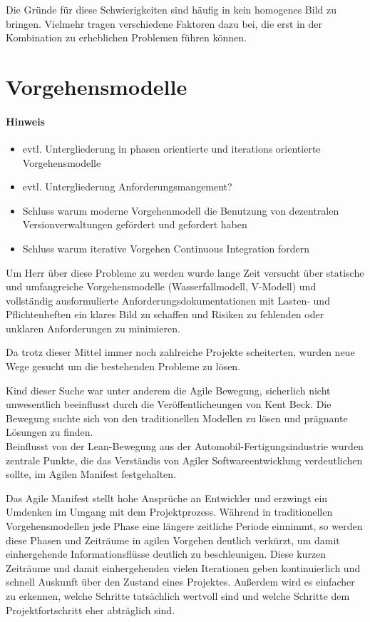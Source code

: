 \documentclass[10pt,a4paper]{book}
\begin{document}
Die Gründe für diese Schwierigkeiten sind häufig in kein homogenes Bild zu bringen. Vielmehr tragen verschiedene Faktoren dazu bei, die erst in der Kombination zu erheblichen Problemen führen können.

\section{Vorgehensmodelle}
\paragraph{Hinweis}

\begin{itemize}
\item evtl. Untergliederung in phasen orientierte und iterations orientierte Vorgehensmodelle
\item  evtl. Untergliederung Anforderungsmangement?
\item Schluss warum moderne Vorgehenmodell die Benutzung von dezentralen Versionverwaltungen gefördert und gefordert haben
\item Schluss warum iterative Vorgehen Continuous Integration fordern
\end{itemize}

\vspace{1em}

Um Herr über diese Probleme zu werden wurde lange Zeit versucht über statische und umfangreiche Vorgehensmodelle (Wasserfallmodell, V-Modell) und vollständig ausformulierte Anforderungsdokumentationen mit Lasten- und Pflichtenheften ein klares Bild zu schaffen und Risiken zu fehlenden oder unklaren Anforderungen zu minimieren.

Da trotz dieser Mittel immer noch zahlreiche Projekte scheiterten, wurden neue Wege gesucht um die bestehenden Probleme zu lösen.

Kind dieser Suche war unter anderem die Agile Bewegung, sicherlich nicht unwesentlich beeinflusst durch die Veröffentlicheungen von Kent Beck. Die Bewegung suchte sich von den traditionellen Modellen zu lösen und prägnante Lösungen zu finden.\\
Beinflusst von der Lean-Bewegung aus der Automobil-Fertigungsindustrie wurden zentrale Punkte, die das Verständis von Agiler Softwareentwicklung verdeutlichen sollte, im Agilen Manifest festgehalten.

Das Agile Manifest stellt hohe Ansprüche an Entwickler und erzwingt ein Umdenken im Umgang mit dem Projektprozess. Während in traditionellen Vorgehensmodellen jede Phase eine längere zeitliche Periode einnimmt, so werden diese Phasen und Zeiträume in agilen Vorgehen deutlich verkürzt, um damit einhergehende Informationsflüsse deutlich zu beschleunigen.
Diese kurzen Zeiträume und damit einhergehenden vielen Iterationen geben kontinuierlich und schnell Auskunft über den Zustand eines Projektes. Außerdem wird es einfacher zu erkennen, welche Schritte tatsächlich wertvoll sind und welche Schritte dem Projektfortschritt eher abträglich sind. 
\end{document}
